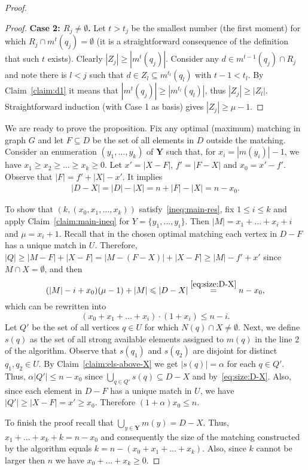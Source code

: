 \documentclass[12pt]{amsart}
\renewcommand{\leq}{\leqslant}
\renewcommand{\geq}{\geqslant}
\theoremstyle{definition}
\newcommand{\abs}[1]{\left\vert#1\right\vert}
\begin{document}
\begin{proof}
\begin{proof}
\textbf{Case 2: $R_j \neq \emptyset$.} 
Let $t>t_j$ be the smallest number (the first moment) for which $R_j \cap m^t(q_j) = \emptyset$ (it is a straightforward consequence of the definition that such $t$ exists). 
Clearly  $\abs{Z_j} \geq  \abs{m^{t}(q_j)}$. 
Consider any $d\in m^{t-1}(q_j) \cap  R_j$ and note there is $l<j$ such that $d\in Z_l\subseteq m^{t_l}(q_l)$ with $t-1 < t_l$. 
By Claim~\ref{claim:d1} it means that $\abs{m^{t}(q_j)}\geq \abs{m^{t_l}(q_l)}$, thus $\abs{Z_j} \geq \abs{Z_l}$. 
Straightforward induction (with Case 1 as basis) gives $\abs{Z_j}\geq \mu-1$.
\end{proof}

We are ready to prove the proposition. 
Fix any optimal (maximum) matching in graph $G$ and let $F\subseteq D$ be the set of all elements in $D$ outside the  matching. 
Consider an enumeration $(y_1,\ldots, y_k)$ of  $\mathbf Y$ such that, for  $x_i=\abs{m(y_i)}-1$, we have $ x_1\geq x_2\geq \ldots\geq x_k\geq 0$. 
Let $x'=\abs{X-F}$, $f'=\abs{F-X}$ and $x_0 = x'-f'$.
Observe that $\abs{F} = f'+\abs{X}-x'$. 
It implies
\begin{align}\label{eq:size:D-X}
 \abs{D-X}=\abs{D}-\abs{X}= n + \abs{F}-\abs{X} = n-x_0.
\end{align}

To show that $(k, (x_0,x_1, \ldots,x_k))$ satisfy~\eqref{ineq:main-res}, fix $1\leq i\leq k$ and apply Claim~\ref{claim:main-ineq} for $Y=\{y_1,\ldots,y_i\}$.  
Then $\abs{M}=x_1+\ldots+x_i+i$ and  $\mu = x_i+1$. 
Recall that in the chosen optimal matching each vertex in $D-F$ has a unique match in $U$.
Therefore, $\abs{Q} \geq \abs{M-F}+\abs{X-F} = \abs{M-(F-X)}+\abs{X-F}  \geq \abs{M}-f'+x'$ 
since $M\cap X = \emptyset$,
and then
$$(\abs{M}-i+x_0)(\mu-1)+\abs{M}\leq \abs{D-X} \buildrel \eqref{eq:size:D-X}\over = n-x_0,$$ 
which  can be  rewritten into
\[ (x_0+x_1+\ldots+x_i)\cdot(1+x_i)\leq n-i.\]
Let $Q'$ be the set of all vertices $q\in U$ for which $N(q)\cap X \neq\emptyset$. 
Next, we define $s(q)$ as the set of all strong available elements assigned to $m(q)$ in the line $2$ of the algorithm. 
Observe that $s(q_1)$ and $s(q_2)$ are disjoint for distinct $q_1,q_2\in U$. 
By Claim~\ref{claim:els-above-X} we get $\abs{s(q)}=\alpha$ for each $q\in Q'$. 
Thus, $\alpha\abs{Q'}\leq n-x_0$ since $\bigcup_{q\in Q'}s(q) \subseteq D-X$ and by~\eqref{eq:size:D-X}.
Also, since each element in $D-F$ has a unique match in $U$, we have $\abs{Q'}\geq \abs{X-F}=x'\geq x_0$.  Therefore
$ (1+\alpha)x_0 \leq n. $


To finish the proof recall that $\bigcup_{y\in \mathbf Y} m(y) = D-X$.
Thus, $x_1+\ldots+x_k+k=n-x_0$ and consequently the size of the matching constructed by the algorithm equals $k = n-(x_0+x_1+\ldots+x_k)$.
Also, since $k$ cannot be larger then $n$ we have $x_0+\ldots+ x_k \geq0$.
\end{proof}
\end{document}
